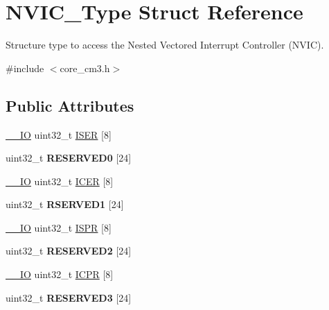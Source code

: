 \hypertarget{struct_n_v_i_c___type}{\section{N\-V\-I\-C\-\_\-\-Type Struct Reference}
\label{struct_n_v_i_c___type}
}


Structure type to access the Nested Vectored Interrupt Controller (N\-V\-I\-C).  




{\ttfamily \#include $<$core\-\_\-cm3.\-h$>$}

\subsection*{Public Attributes}
\begin{DoxyCompactItemize}
\item 
\hyperlink{group___c_m_s_i_s__core__definitions_gaec43007d9998a0a0e01faede4133d6be}{\-\_\-\-\_\-\-I\-O} uint32\-\_\-t \hyperlink{struct_n_v_i_c___type_a49017ceff4cda919c8058e9b192bfa08}{I\-S\-E\-R} \mbox{[}8\mbox{]}
\item 
\hypertarget{struct_n_v_i_c___type_abf174b542f11f026eabdc8a74c93ab6e}{uint32\-\_\-t {\bfseries R\-E\-S\-E\-R\-V\-E\-D0} \mbox{[}24\mbox{]}}\label{struct_n_v_i_c___type_abf174b542f11f026eabdc8a74c93ab6e}

\item 
\hyperlink{group___c_m_s_i_s__core__definitions_gaec43007d9998a0a0e01faede4133d6be}{\-\_\-\-\_\-\-I\-O} uint32\-\_\-t \hyperlink{struct_n_v_i_c___type_a2cfb5b93103f658e0521d45bde6f84fd}{I\-C\-E\-R} \mbox{[}8\mbox{]}
\item 
\hypertarget{struct_n_v_i_c___type_af3ae867e627035f400558623045ee69c}{uint32\-\_\-t {\bfseries R\-S\-E\-R\-V\-E\-D1} \mbox{[}24\mbox{]}}\label{struct_n_v_i_c___type_af3ae867e627035f400558623045ee69c}

\item 
\hyperlink{group___c_m_s_i_s__core__definitions_gaec43007d9998a0a0e01faede4133d6be}{\-\_\-\-\_\-\-I\-O} uint32\-\_\-t \hyperlink{struct_n_v_i_c___type_ab7aef74794b43a7df880e19ed50b6257}{I\-S\-P\-R} \mbox{[}8\mbox{]}
\item 
\hypertarget{struct_n_v_i_c___type_a8e5857c94d765a0855eeec1e6bec1006}{uint32\-\_\-t {\bfseries R\-E\-S\-E\-R\-V\-E\-D2} \mbox{[}24\mbox{]}}\label{struct_n_v_i_c___type_a8e5857c94d765a0855eeec1e6bec1006}

\item 
\hyperlink{group___c_m_s_i_s__core__definitions_gaec43007d9998a0a0e01faede4133d6be}{\-\_\-\-\_\-\-I\-O} uint32\-\_\-t \hyperlink{struct_n_v_i_c___type_a850acda355b0d6a404feb2be9df69b2d}{I\-C\-P\-R} \mbox{[}8\mbox{]}
\item 
\hypertarget{struct_n_v_i_c___type_a37554ccda2b131e7528232e9150b1c4f}{uint32\-\_\-t {\bfseries R\-E\-S\-E\-R\-V\-E\-D3} \mbox{[}24\mbox{]}}\label{struct_n_v_i_c___type_a37554ccda2b131e7528232e9150b1c4f}


\end{DoxyCompactItemize}
